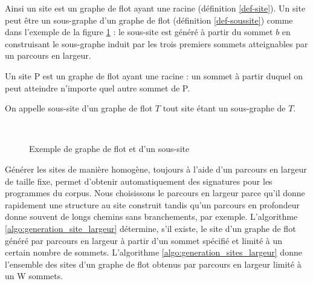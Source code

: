 Ainsi un site est un graphe de flot ayant une racine (définition \ref{def-site}). Un site peut être un sous-graphe d'un graphe de flot (définition \ref{def-soussite}) comme dans l'exemple de la figure \ref{fig:ex-gf-site} : le sous-site est généré à partir du sommet $b$ en construisant le sous-graphe induit par les trois premiers sommets atteignables par un parcours en largeur.

\begin{defi}\label{def-site}
Un site P est un graphe de flot ayant une racine : un sommet à partir duquel on peut atteindre n'importe quel autre sommet de P.
\end{defi}

\begin{defi}\label{def-soussite}
On appelle sous-site d'un graphe de flot $T$ tout site étant un sous-graphe de $T$.
\end{defi}

\begin{figure}[h]
\begin{center}
  \subfigure[Graphe de flot T]{
\label{fig:ex-gf}
\texttt{[image: supports/algos/gTGF\_circo\_cropped0.pdf]}
}\quad
  \subfigure[Site P, de racine b, isomorphe à un sous-graphe de T]{
\label{fig:ex-site}
\texttt{[image: supports/algos/gPsite\_circo\_cropped0.pdf]}
}\\
\end{center}
\caption{Exemple de graphe de flot et d'un sous-site}
\label{fig:ex-gf-site}
\end{figure}

Générer les sites de manière homogène, toujours à l'aide d'un parcours en largeur de taille fixe, permet d'obtenir automatiquement des signatures pour les programmes du corpus.
Nous choisissons le parcours en largeur parce qu'il donne rapidement une structure au site construit tandis qu'un parcours en profondeur donne souvent de longs chemins sans branchements, par exemple.
L'algorithme \ref{algo:generation_site_largeur} détermine, s'il existe, le site d'un graphe de flot généré par parcours en largeur à partir d'un sommet spécifié et limité à un certain nombre de sommets. L'algorithme \ref{algo:generation_sites_largeur} donne l'ensemble des sites d'un graphe de flot obtenus par parcours en largeur limité à un W sommets.

